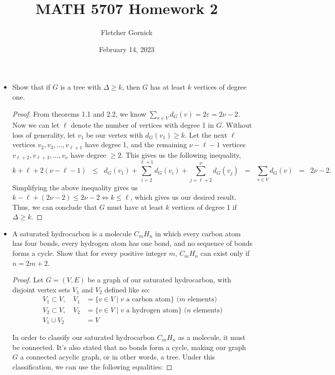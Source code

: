 \documentclass[11pt]{article}
\title{\vspace{-1.0cm}MATH 5707 Homework 2}
\author{Fletcher Gornick}
\date{February 14, 2023}
\newcommand\itm[1]{\item[\textbf{#1}]}
\begin{document}
\maketitle
\begin{itemize}
  \itm{2.1.6} Show that if \(G\) is a tree with \(\Delta \geq k\), then \(G\) has at least \(k\) vertices of degree one.
  \begin{proof}
    From theorems 1.1 and 2.2, we know \(\displaystyle\sum_{v \in V} d_G(v) = 2\varepsilon = 2\nu - 2.\)
    Now we can let \(\ell\) denote the number of vertices with degree 1 in \(G\).  Without loss of generality, let \(v_1\) be our vertex with \(d_G(v_1) \geq k\).  Let the next \(\ell\) vertices \(v_2,v_3,\hdots,v_{\ell + 1}\) have degree 1, and the remaining \(\nu - \ell - 1\) vertices \(v_{\ell+2}, v_{\ell+3}, \hdots, v_{\nu}\) have degree \(\geq 2\).  This gives us the following inequality,
    \[k + \ell + 2(\nu - \ell - 1) \;\;\leq\;\; d_G(v_1) + \sum_{i=2}^{\ell + 1} d_G(v_i) + \sum_{j=\ell+2}^{\nu} d_G(v_j) \;\;=\;\; \sum_{v \in V} d_G(v) \;\;=\;\; 2\nu - 2.\]
    Simplifying the above inequality gives us \(k - \ell + (2\nu - 2) \leq 2\nu - 2 \iff k \leq \ell\), which gives us our desired result.  Thus, we can conclude that \(G\) must have at least \(k\) vertices of degree 1 if \(\Delta \geq k\).
  \end{proof}
  



  \itm{2.1.12} A saturated hydrocarbon is a molecule \(C_m H_n\) in which every carbon atom has four bonds, every hydrogen atom has one bond, and no sequence of bonds forms a cycle.  Show that for every positive integer \(m\), \(C_m H_n\) can exist only if \(n = 2m + 2\).
  \begin{proof}
    Let \(G = (V, E)\) be a graph of our saturated hydrocarbon, with disjoint vertex sets \(V_1\) and \(V_2\) defined like so:
    \begin{align*}
      V_1 \subset V, \quad V_1 &= \{v \in V \mid v \text{ a carbon atom}\}  \text{ (\(m\) elements)} \\
      V_2 \subset V, \quad V_2 &= \{v \in V \mid v \text{ a hydrogen atom}\}  \text{ (\(n\) elements)} \\
      V_1 \cup V_2 &= V
    \end{align*}

    In order to classify our saturated hydrocarbon \(C_m H_n\) as a molecule, it must be connected.  It's also stated that no bonds form a cycle, making our graph \(G\) a connected acyclic graph, or in other words, a tree.  Under this classification, we can use the following equalities:


\end{proof}
\end{itemize}
\end{document}
